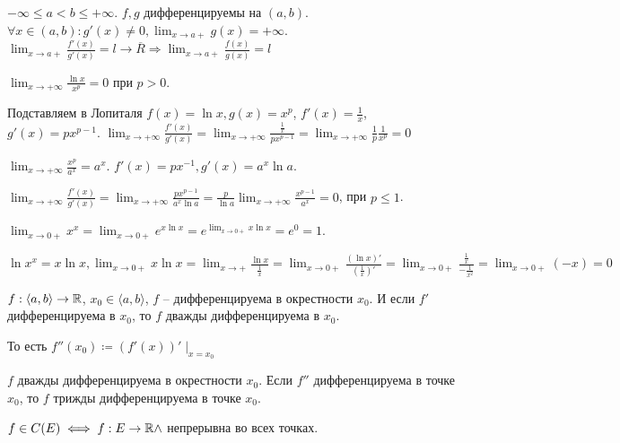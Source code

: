 \begin{theorem}
    $-\infty \le a < b \le +\infty$. $f, g$ дифференцируемы на  $(a, b)$.  $\forall x\in (a, b)\!: g'(x) \neq 0, \lim_{x \to a+}g(x) = +\infty$.  $\lim_{x \to a+} \frac{f'(x)}{g'(x)} =l \to \overline{R} \Rightarrow \lim_{x \to a+} \frac{f(x)}{g(x)} = l$
\end{theorem}
\begin{example}
    $\lim_{x \to +\infty} \frac{\ln x}{x^p} = 0$ при $p > 0$.

    Подставляем в Лопиталя  $f(x) = \ln x, g(x) = x^p$,  $f'(x) = \frac{1}{x}$, $g'(x) = px^{p - 1}$.  $\lim_{x \to + \infty}\frac{f'(x)}{g'(x)} = \lim_{x \to +\infty} \frac{\frac{1}{x}}{px^{p-1}} = \lim_{x \to +\infty} \frac{1}{p} \frac{1}{x^p} = 0$
\end{example}
\begin{example}
    $\lim_{x \to +\infty} \frac{x^p}{a^x} = a^x$. $f'(x) = px^{-1}, g'(x) = a^x \ln a$.

    $\lim_{x \to +\infty} \frac{f'(x)}{g'(x)} = \lim_{x \to +\infty} \frac{px^{p-1}}{a^x \ln a} =  \frac{p}{\ln a} \lim_{x \to +\infty} \frac{x^{p-1}}{a^x} = 0$, при $p \le 1$.
\end{example}
\begin{example}
    $\lim_{x \to 0+} x^x = \lim_{x \to 0+} e^{x \ln x} = e^{\lim_{x \to 0+} x \ln x} = e^0 = 1$.
    
    $\ln x^x = x \ln x, \lim_{x \to 0+} x \ln x = \lim_{x \to +} \frac{\ln x}{\frac{1}{x}} = \lim_{x \to 0+} \frac{(\ln x)'}{(\frac{1}{x})'} = \lim_{x \to 0+} \frac{\frac{1}{x}}{-\frac{1}{x^2}} = \lim_{x \to 0+}(-x) = 0$
\end{example}
\begin{definition}
    $f: \langle a, b \rangle \to \mathbb{R}$,  $x_0 \in \langle a, b \rangle$, $f$ -- дифференцируема в окрестности  $x_0$.
    И если $f'$ дифференцируема в $x_0$, то $f$ дважды дифференцируема в $x_0$.

    То есть $f''(x_0) \coloneqq (f'(x))'\mid_{x=x_0}$
\end{definition}
\begin{definition}
    $f$ дважды дифференцируема в окрестности $x_0$. Если $f''$ дифференцируема в точке  $x_0$, то $f$ трижды дифференцируема в точке  $x_0$. 
\end{definition}
\begin{definition}
    $f \in C(E) \iff f: E \to \mathbb{R} \land$ непрерывна во всех точках.
\end{definition}
